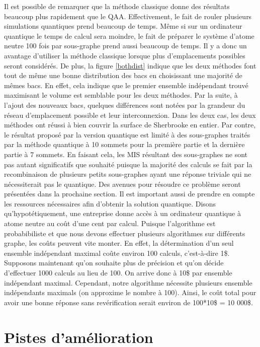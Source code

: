 \documentclass[11pt]{article}
\begin{document}
Il est possible de remarquer que la méthode classique donne des résultats beaucoup plus rapidement que le QAA. Effectivement, le fait de rouler plusieurs simulations quantiques prend beaucoup de temps. Même si sur un ordinateur quantique le temps de calcul sera moindre, le fait de préparer le système d'atome neutre 100 fois par sous-graphe prend aussi beaucoup de temps. Il y a donc un avantage d'utiliser la méthode classique lorsque plus d'emplacements possibles seront considérés. De plus, la figure \ref{bothdist} indique que les deux méthodes font tout de même une bonne distribution des bacs en choisissant une majorité de mêmes bacs. En effet, cela indique que le premier ensemble indépendant trouvé maximisant le volume est semblable pour les deux méthodes.  Par la suite, à l'ajout des nouveaux bacs, quelques différences sont notées par la grandeur du réseau d'emplacement possible et leur interconnexion. Dans les deux cas, les deux méthodes ont réussi à bien couvrir la surface de Sherbrooke en entier. Par contre, le résultat proposé par la version quantique est limité à des sous-graphes traités par la méthode quantique à 10 sommets pour la première partie et la dernière partie à 7 sommets. En faisant cela, les MIS résultant des sous-graphes ne sont pas autant significatifs que souhaité puisque la majorité des calculs se fait par la recombinaison de plusieurs petits sous-graphes ayant une réponse triviale qui ne nécessiterait pas le quantique. Des avenues pour résoudre ce problème seront présentées dans la prochaine section. Il est important aussi de prendre en compte les ressources nécessaires afin d'obtenir la solution quantique. Disons qu'hypotétiquement, une entreprise donne accès à un ordinateur quantique à atome neutre au coût d'une cent par calcul. Puisque l'algorithme est probabibiliste et que nous devons effectuer plusieurs algorithmes sur différents graphe, les coûts peuvent vite monter. En effet, la détermination d'un seul ensemble indépendant maximal coûte environ 100 calculs, c'est-à-dire 1\$. Supposons maintenant qu'on souhaite plus de précision et qu'on décide d'effectuer 1000 calculs au lieu de 100. On arrive donc à 10\$ par ensemble indépendant maximal. Cependant, notre algorithme nécessite plusieurs ensemble indépendants maximals (on approxime le nombre à 100). Ainsi, le coût total pour avoir une bonne réponse sans revérification serait environ de 100*10\$ = 10 000\$. 


\section{Pistes d'amélioration}
\end{document}
